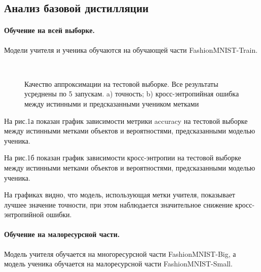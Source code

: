 \newpage
\subsection{Анализ базовой дистилляции}

\paragraph{Обучение на всей выборке.}
Модели учителя и ученика обучаются на обучающей части FashionMNIST-Train.

\begin{figure}[h!t]\center
{}
\\
\caption{Качество аппроксимации на тестовой выборке. Все результаты усреднены по 5 запускам. a) точность; b) кросс-энтропийная ошибка между истинными и предсказанными учеником метками}
\end{figure}

На рис.1а показан график зависимости метрики accuracy на тестовой выборке между истинными метками объектов и вероятностями, предсказанными моделью ученика.

На рис.1б показан график зависимости кросс-энтропии на тестовой выборке между истинными метками объектов и вероятностями, предсказанными моделью ученика.

На графиках видно, что модель, использующая метки учителя, показывает лучшее значение точности, при этом наблюдается значительное снижение кросс-энтропийной ошибки.

\newpage
\paragraph{Обучение на малоресурсной части.}
Модель учителя обучается на многоресурсной части FashionMNIST-Big, а модель ученика обучается на малоресурсной части FashionMNIST-Small.

